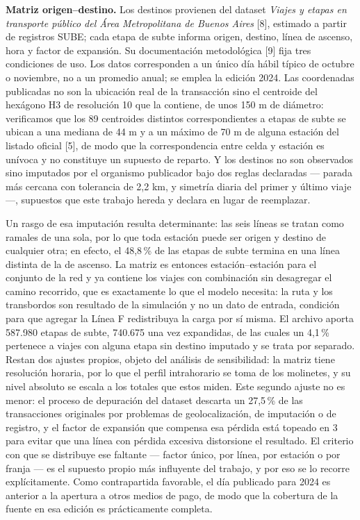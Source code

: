 \documentclass{article}
\begin{document}
\textbf{Matriz origen--destino.} Los destinos provienen del dataset \textit{Viajes y etapas en transporte
público del Área Metropolitana de Buenos Aires} [8], estimado a partir de registros SUBE; cada etapa de
subte informa origen, destino, línea de ascenso, hora y factor de expansión. Su documentación metodológica
[9] fija tres condiciones de uso. Los datos corresponden a un único día hábil típico de octubre o noviembre,
no a un promedio anual; se emplea la edición 2024. Las coordenadas publicadas no son la ubicación real de la
transacción sino el centroide del hexágono H3 de resolución 10 que la contiene, de unos 150 m de diámetro:
verificamos que los 89 centroides distintos correspondientes a etapas de subte se ubican a una mediana de
44 m y a un máximo de 70 m de alguna estación del listado oficial [5], de modo que la correspondencia entre
celda y estación es unívoca y no constituye un supuesto de reparto. Y los destinos no son observados sino
imputados por el organismo publicador bajo dos reglas declaradas --- parada más cercana con tolerancia de
2,2 km, y simetría diaria del primer y último viaje ---, supuestos que este trabajo hereda y declara en
lugar de reemplazar.

Un rasgo de esa imputación resulta determinante: las seis líneas se tratan como ramales de una sola, por lo
que toda estación puede ser origen y destino de cualquier otra; en efecto, el 48,8\,\% de las etapas de
subte termina en una línea distinta de la de ascenso. La matriz es entonces estación--estación para el
conjunto de la red y ya contiene los viajes con combinación sin desagregar el camino recorrido, que es
exactamente lo que el modelo necesita: la ruta y los transbordos son resultado de la simulación y no un dato
de entrada, condición para que agregar la Línea F redistribuya la carga por sí misma. El archivo aporta
587.980 etapas de subte, 740.675 una vez expandidas, de las cuales un 4,1\,\% pertenece a viajes con alguna
etapa sin destino imputado y se trata por separado. Restan dos ajustes propios, objeto del análisis de
sensibilidad: la matriz tiene resolución horaria, por lo que el perfil intrahorario se toma de los
molinetes, y su nivel absoluto se escala a los totales que estos miden. Este segundo ajuste no es menor: el
proceso de depuración del dataset descarta un 27,5\,\% de las transacciones originales por problemas de
geolocalización, de imputación o de registro, y el factor de expansión que compensa esa pérdida está topeado
en 3 para evitar que una línea con pérdida excesiva distorsione el resultado. El criterio con que se
distribuye ese faltante --- factor único, por línea, por estación o por franja --- es el supuesto propio más
influyente del trabajo, y por eso se lo recorre explícitamente. Como contrapartida favorable, el día
publicado para 2024 es anterior a la apertura a otros medios de pago, de modo que la cobertura de la fuente
en esa edición es prácticamente completa.
\end{document}
